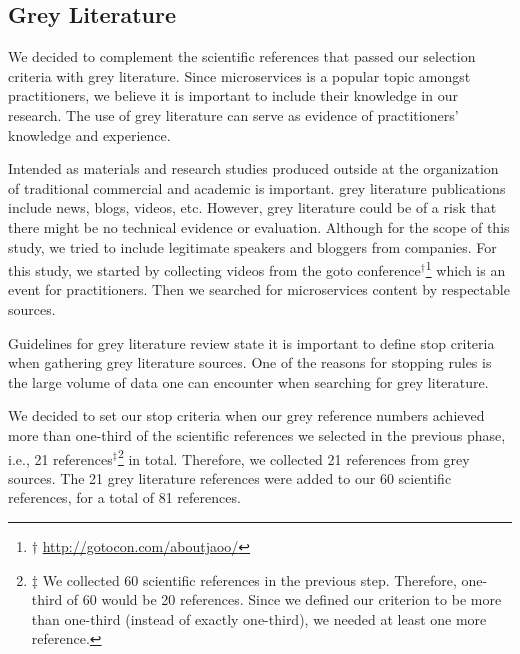 \subsection{Grey Literature}

We decided to complement the scientific references that passed our selection criteria with grey literature.\cite{Garousi2016} Since microservices is a popular topic amongst practitioners, we believe it is important to include their knowledge in our research. The use of grey literature can serve as evidence of practitioners' knowledge and experience.\cite{Kamei2019}

Intended as materials and research studies produced outside at the organization of traditional commercial and academic is important. grey literature publications include news, blogs, videos, etc. However, grey literature could be of a risk that there might be no technical evidence or evaluation. Although for the scope of this study, we tried to include legitimate speakers and bloggers from companies.
%
For this study, we started by collecting videos from the goto conference$^\dagger$\let\thefootnote\relax\footnote{$\dagger$ \url{http://gotocon.com/aboutjaoo/}} which is an event for practitioners. Then we searched for microservices content by respectable sources. 

Guidelines for grey literature review\cite{Garousi2019} state it is important to define stop criteria when gathering grey literature sources. One of the reasons for stopping rules is the large volume of data one can encounter when searching for grey literature.\cite{Garousi2019}

We decided to set our stop criteria when our grey reference numbers achieved more than one-third of the scientific references we selected in the previous phase, i.e., 21 references$^\ddagger$\let\thefootnote\relax\footnote{$\ddagger$ We collected 60 scientific references in the previous step. Therefore, one-third of 60 would be 20 references. Since we defined our criterion to be more than one-third (instead of exactly one-third), we needed at least one more reference.} in total. Therefore, we collected 21 references from grey sources.
%
The 21 grey literature references were added to our 60 scientific references, for a total of 81 references. %



